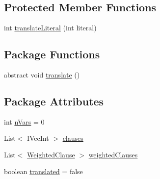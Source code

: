 \subsection*{Protected Member Functions}
\begin{DoxyCompactItemize}
\item 
int \hyperlink{classedu_1_1pku_1_1id_1_1_multi_valued_translater_a4d45510950867b77da6a77692a57abb2}{translateLiteral} (int literal)
\end{DoxyCompactItemize}
\subsection*{Package Functions}
\begin{DoxyCompactItemize}
\item 
abstract void \hyperlink{classedu_1_1pku_1_1id_1_1_multi_valued_translater_a57e687a8b1c011fb7c0ccbd72272e328}{translate} ()
\end{DoxyCompactItemize}
\subsection*{Package Attributes}
\begin{DoxyCompactItemize}
\item 
int \hyperlink{classedu_1_1pku_1_1id_1_1_multi_valued_translater_ac32ccbcc28ed991632d9d95eeb10f279}{nVars} = 0
\item 
List$<$ IVecInt $>$ \hyperlink{classedu_1_1pku_1_1id_1_1_multi_valued_translater_ac5e73cd4928c489b13949689250bdd33}{clauses}
\item 
List$<$ \hyperlink{classedu_1_1pku_1_1id_1_1_weighted_clause}{WeightedClause} $>$ \hyperlink{classedu_1_1pku_1_1id_1_1_multi_valued_translater_af8448dcc0a0420748f9d331c0be01ef2}{weightedClauses}
\item 
boolean \hyperlink{classedu_1_1pku_1_1id_1_1_multi_valued_translater_a201fef561c0cfbcd87bae63db0ec4c1a}{translated} = false
\end{DoxyCompactItemize}


